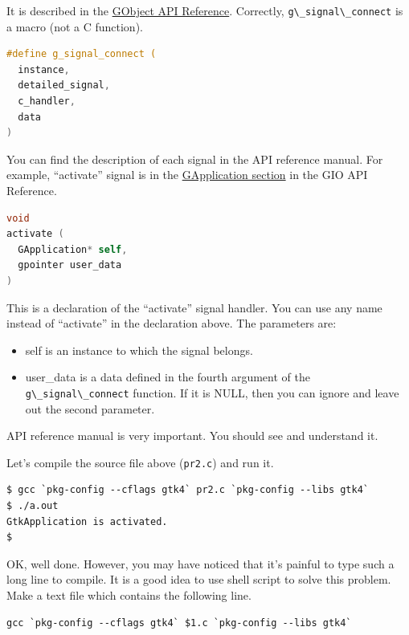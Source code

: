 It is described in the
\href{https://docs.gtk.org/gobject/func.signal_connect.html}{GObject API
Reference}. Correctly, \passthrough{\lstinline!g\_signal\_connect!} is a
macro (not a C function).

\begin{lstlisting}[language=C]
#define g_signal_connect (
  instance,
  detailed_signal,
  c_handler,
  data
)
\end{lstlisting}

You can find the description of each signal in the API reference manual.
For example, ``activate'' signal is in the
\href{https://docs.gtk.org/gio/signal.Application.activate.html}{GApplication
section} in the GIO API Reference.

\begin{lstlisting}[language=C]
void
activate (
  GApplication* self,
  gpointer user_data
)
\end{lstlisting}

This is a declaration of the ``activate'' signal handler. You can use
any name instead of ``activate'' in the declaration above. The
parameters are:

\begin{itemize}
\tightlist
\item
  self is an instance to which the signal belongs.
\item
  user\_data is a data defined in the fourth argument of the
  \passthrough{\lstinline!g\_signal\_connect!} function. If it is NULL,
  then you can ignore and leave out the second parameter.
\end{itemize}

API reference manual is very important. You should see and understand
it.

Let's compile the source file above (\passthrough{\lstinline!pr2.c!})
and run it.

\begin{lstlisting}
$ gcc `pkg-config --cflags gtk4` pr2.c `pkg-config --libs gtk4`
$ ./a.out
GtkApplication is activated.
$
\end{lstlisting}

OK, well done. However, you may have noticed that it's painful to type
such a long line to compile. It is a good idea to use shell script to
solve this problem. Make a text file which contains the following line.

\begin{lstlisting}
gcc `pkg-config --cflags gtk4` $1.c `pkg-config --libs gtk4`
\end{lstlisting}

